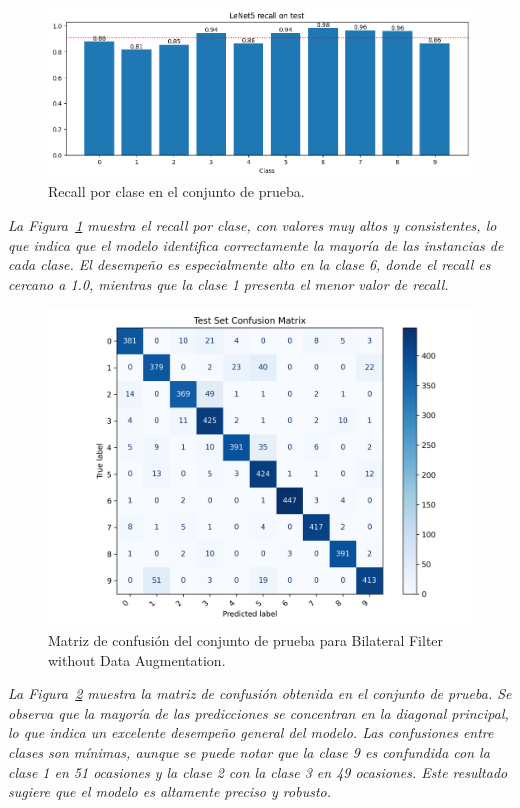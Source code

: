 \documentclass[conference]{IEEEtran}
\begin{document}
\begin{figure}[H]
    \centering
    \includegraphics[width=0.95\linewidth]{graphics-bilateral/bilateral-recall-test.png}
    \caption{Recall por clase en el conjunto de prueba.}
    \label{fig:bilateral-recall-test}
\end{figure}
\noindent\textit{
La Figura~\ref{fig:bilateral-recall-test} muestra el recall por clase, con valores muy altos y consistentes, lo que indica que el modelo identifica correctamente la mayoría de las instancias de cada clase. El desempeño es especialmente alto en la clase 6, donde el recall es cercano a 1.0, mientras que la clase 1 presenta el menor valor de recall.
}


\begin{figure}[H]
    \centering
    \includegraphics[width=0.95\linewidth]{graphics-bilateral/bilateral-confusion-matrix.png}
    \caption{Matriz de confusión del conjunto de prueba para Bilateral Filter without Data Augmentation.}
    \label{fig:bilateral-confusion-matrix}
\end{figure}
\noindent\textit{
La Figura~\ref{fig:bilateral-confusion-matrix} muestra la matriz de confusión obtenida en el conjunto de prueba. Se observa que la mayoría de las predicciones se concentran en la diagonal principal, lo que indica un excelente desempeño general del modelo. Las confusiones entre clases son mínimas, aunque se puede notar que la clase 9 es confundida con la clase 1 en 51 ocasiones y la clase 2 con la clase 3 en 49 ocasiones. Este resultado sugiere que el modelo es altamente preciso y robusto.
}
\end{document}
